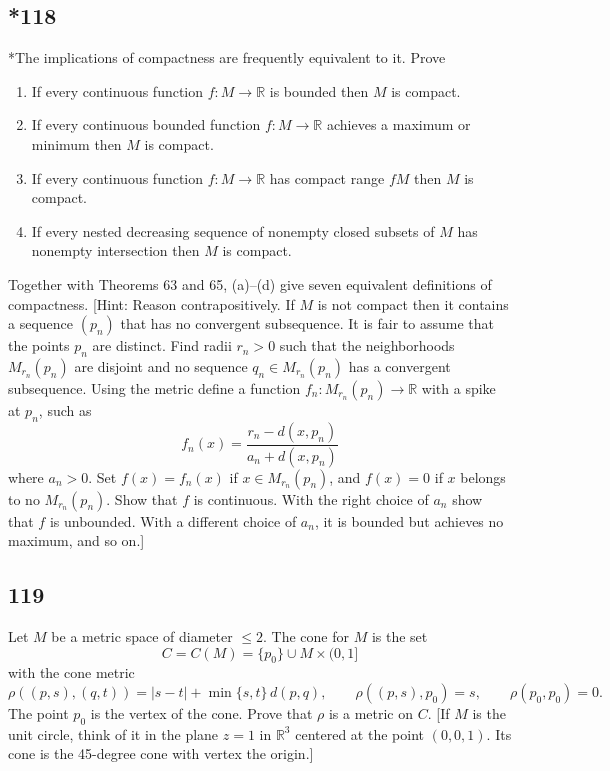 \documentclass{amsart}
\begin{document}
\subsection*{*118}
*The implications of compactness are frequently equivalent to it. Prove
\begin{enumerate}[label=(\alph*)]
\item If every continuous function $f : M \to \mathbb{R}$ is bounded then $M$ is compact.
\item If every continuous bounded function $f : M \to \mathbb{R}$ achieves a maximum or minimum then $M$ is compact.
\item If every continuous function $f : M \to \mathbb{R}$ has compact range $fM$ then $M$ is compact.
\item If every nested decreasing sequence of nonempty closed subsets of $M$ has nonempty intersection then $M$ is compact.
\end{enumerate}
Together with Theorems 63 and 65, (a)--(d) give seven equivalent definitions of compactness. [Hint: Reason contrapositively. If $M$ is not compact then it contains a sequence $(p_n)$ that has no convergent subsequence. It is fair to assume that the points $p_n$ are distinct. Find radii $r_n>0$ such that the neighborhoods $M_{r_n}(p_n)$ are disjoint and no sequence $q_n \in M_{r_n}(p_n)$ has a convergent subsequence. Using the metric define a function $f_n : M_{r_n}(p_n) \to \mathbb{R}$ with a spike at $p_n$, such as
\[
f_n(x) = \frac{r_n - d(x,p_n)}{a_n + d(x,p_n)}
\]
where $a_n>0$. Set $f(x) = f_n(x)$ if $x \in M_{r_n}(p_n)$, and $f(x)=0$ if $x$ belongs to no $M_{r_n}(p_n)$. Show that $f$ is continuous. With the right choice of $a_n$ show that $f$ is unbounded. With a different choice of $a_n$, it is bounded but achieves no maximum, and so on.]

\subsection*{119}
Let $M$ be a metric space of diameter $\le 2$. The cone for $M$ is the set
\[
C = C(M) = \{p_0\} \cup M \times (0,1]
\]
with the cone metric
\[
\rho((p,s),(q,t)) = |s-t| + \min\{s,t\}\, d(p,q), \qquad \rho((p,s),p_0) = s, \qquad \rho(p_0,p_0) = 0.
\]
The point $p_0$ is the vertex of the cone. Prove that $\rho$ is a metric on $C$. [If $M$ is the unit circle, think of it in the plane $z=1$ in $\mathbb{R}^3$ centered at the point $(0,0,1)$. Its cone is the 45-degree cone with vertex the origin.]
\end{document}
